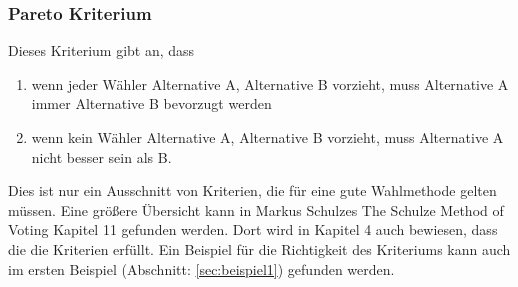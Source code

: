 \subsubsection{Pareto Kriterium} 
\label{sec:paretoKriterium}
Dieses Kriterium gibt an, dass
\begin{enumerate}
\item wenn jeder Wähler Alternative A, Alternative B vorzieht, muss Alternative A immer Alternative B bevorzugt werden
\item wenn kein Wähler Alternative A, Alternative B vorzieht, muss Alternative A nicht besser sein als B. \citep{Schulze2017}
\end{enumerate}

Dies ist nur ein Ausschnitt von Kriterien, die für eine gute Wahlmethode gelten müssen. Eine größere Übersicht kann in Markus Schulzes \glqq The Schulze Method
of Voting\grqq{} \citep{Schulze2018} Kapitel 11 gefunden werden. Dort wird in Kapitel 4 auch bewiesen, dass die \schulze die Kriterien erfüllt. Ein Beispiel für die Richtigkeit des \condorcet Kriteriums kann auch im ersten Beispiel (Abschnitt: \ref{sec:beispiel1})  gefunden werden.



